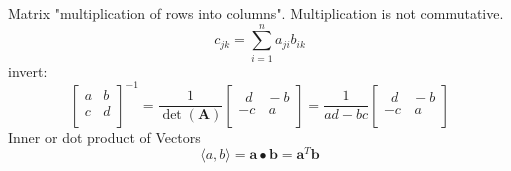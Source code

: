 \documentclass{article}
\begin{document}
	Matrix "multiplication of rows into columns". Multiplication is not commutative.
	\begin{equation}
		c_{jk} = \sum_{i=1}^{n} a_{ji}b_{ik}
	\end{equation}
	invert: 
	\begin{equation}
		\begin{bmatrix}
			a & b \\ c & d \\ 
		\end{bmatrix}^{-1} =
		\frac{1}{\det(\mathbf{A})} 
		\begin{bmatrix}
			\,\,\,d & \!\!-b \\ -c & \,a \\ 
		\end{bmatrix} =
		\frac{1}{ad - bc} 
		\begin{bmatrix}
			\,\,\,d & \!\!-b \\ -c & \,a \\ 
		\end{bmatrix}
	\end{equation}
	Inner or dot product of Vectors
	\begin{equation}
		\langle a,b \rangle = \mathbf{a} \bullet \mathbf{b} = \textbf{a}^T\mathbf{b} 
	\end{equation}
\end{document}
